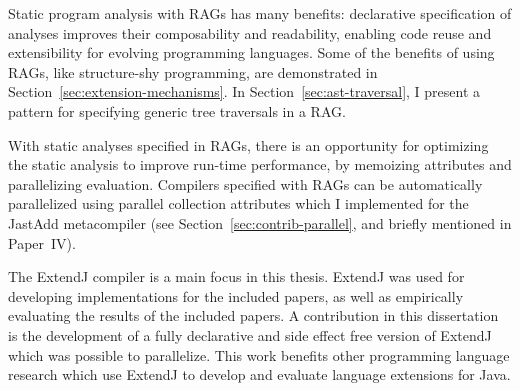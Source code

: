 \documentclass[10pt, twoside, openright]{book}
\newcommand{\secref}[1]{Section~\ref{#1}}
\begin{document}
Static program analysis with RAGs has many benefits: declarative specification of analyses
improves their composability and readability, enabling code reuse and extensibility
for evolving programming languages.
Some of the benefits of using RAGs, like structure-shy programming,
are demonstrated in \secref{sec:extension-mechanisms}. In  \secref{sec:ast-traversal}, I present a
pattern for specifying generic tree traversals in a RAG.

With static analyses specified in RAGs, there is an opportunity for optimizing the
static analysis to improve run-time performance, by memoizing attributes and
parallelizing evaluation.  Compilers specified with RAGs can be
automatically parallelized using parallel collection
attributes which I implemented for the JastAdd metacompiler (see
\secref{sec:contrib-parallel}, and briefly mentioned in Paper~IV).

The ExtendJ compiler is a main focus in this thesis. ExtendJ was used for developing implementations
for the included papers, as well as empirically evaluating the results of the included papers.
A contribution in this dissertation is the development of a fully declarative and side effect
free version of ExtendJ which was possible to parallelize. This work benefits other programming
language research which use ExtendJ to develop and evaluate language extensions for Java.



{\raggedright%
\printbibliography[segment=\therefsegment,heading=subbibliography]
}%

\renewcommand{\thesection}{\arabic{section}}
\renewcommand{\thefigure}{\arabic{figure}}
\renewcommand{\thetable}{\arabic{table}}
\renewcommand{\thechapter}{\Roman{chapter}}
\renewcommand{\theequation}{\arabic{equation}}
\end{document}
